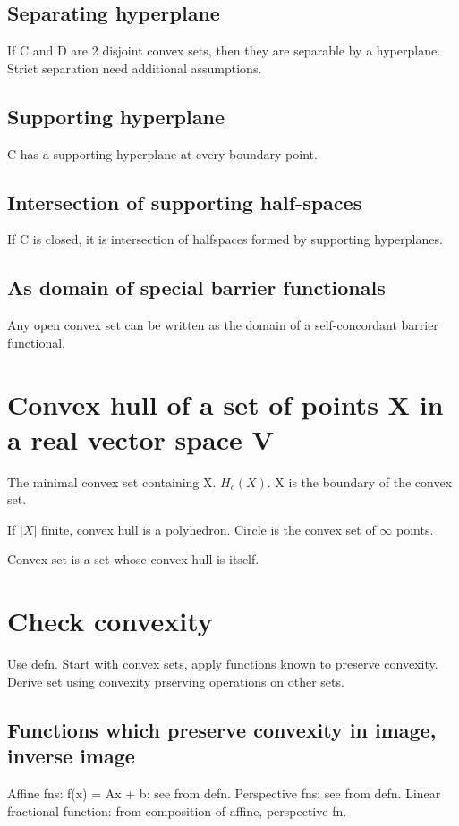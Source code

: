 \documentclass[oneside, article]{memoir}
\begin{document}
\subsection{Separating hyperplane}
If C and D are 2 disjoint convex sets, then they are separable by a hyperplane. Strict separation need additional assumptions.

\subsection{Supporting hyperplane}
C has a supporting hyperplane at every boundary point.

\subsection{Intersection of supporting half-spaces}
If C is closed, it is intersection of halfspaces formed by supporting hyperplanes.

\subsection{As domain of special barrier functionals}
Any open convex set can be written as the domain of a self-concordant barrier functional.

\section{Convex hull of a set of points X in a real vector space V}
The minimal convex set containing X. $H_{c}(X)$. X is the boundary of the convex set.

If $|X|$ finite, convex hull is a polyhedron. Circle is the convex set of $\infty$ points.

Convex set is a set whose convex hull is itself.

\section{Check convexity}
Use defn. Start with convex sets, apply functions known to preserve convexity. Derive set using convexity prserving operations on other sets.

\subsection{Functions which preserve convexity in image, inverse image}
Affine fns: f(x) = Ax + b: see from defn. Perspective fns: see from defn. Linear fractional function: from composition of affine, perspective fn.
\end{document}
